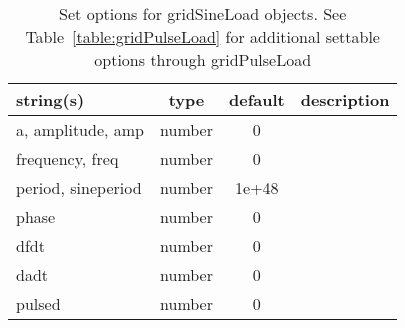 \begin{table}[ht]
\centering
\begin{tabular}{p{5cm} c c p{7cm}}
\hline
string(s) & type & default & description \\
\hline
a, amplitude, amp & number & 0 & \\
frequency, freq & number & 0 & \\
period, sineperiod & number & 1e+48 & \\
phase & number & 0 & \\
dfdt & number & 0 & \\
dadt & number & 0 & \\
pulsed & number & 0 & \\
\hline
\end{tabular}
\caption{Set options for gridSineLoad objects. See Table~\ref{table:gridPulseLoad} for additional settable options through gridPulseLoad}
\label{table:gridSineLoad}
\end{table}


